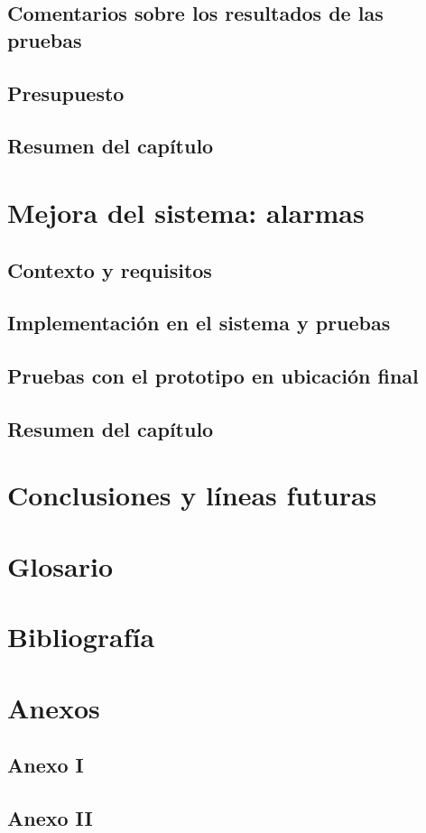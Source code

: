 \documentclass[12pt]{article}
\begin{document}
	\subsection[Comentarios sobre los resultados de las pruebas]{Comentarios sobre los resultados de las pruebas}
	\subsection[Presupuesto]{Presupuesto}
	\subsection[Resumen del capítulo]{Resumen del capítulo}
	
	\section[Mejora del sistema: alarmas]{Mejora del sistema: alarmas}
	\subsection[Contexto y requisitos]{Contexto y requisitos}
	\subsection[Implementación en el sistema y pruebas]{Implementación en el sistema y pruebas}
	\subsection[Pruebas con el prototipo en ubicación final]{Pruebas con el prototipo en ubicación final}
	\subsection[Resumen del capítulo]{Resumen del capítulo}
	
	\section[Conclusiones y líneas futuras]{Conclusiones y líneas futuras}
	
	\section*{Glosario}
	
	\section*{Bibliografía}
	
	\section*{Anexos}
	
	\subsection*{Anexo I}
	
	\subsection*{Anexo II}
	
\end{document}
